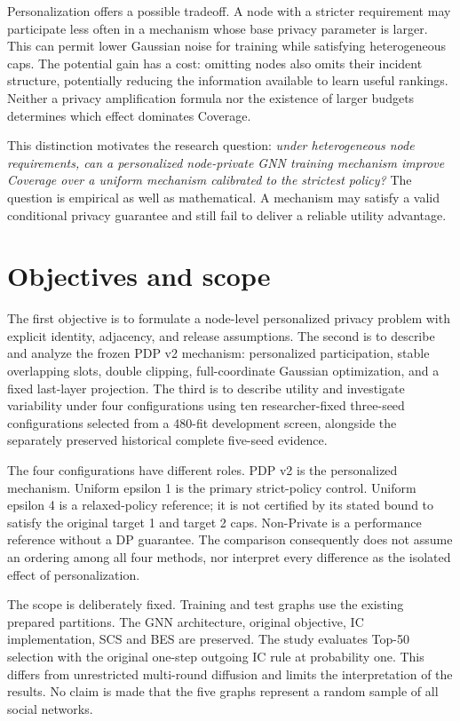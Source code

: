 Personalization offers a possible tradeoff. A node with a stricter requirement may participate less often in a mechanism whose base privacy parameter is larger. This can permit lower Gaussian noise for training while satisfying heterogeneous caps. The potential gain has a cost: omitting nodes also omits their incident structure, potentially reducing the information available to learn useful rankings. Neither a privacy amplification formula nor the existence of larger budgets determines which effect dominates Coverage.

This distinction motivates the research question: \emph{under heterogeneous node requirements, can a personalized node-private GNN training mechanism improve Coverage over a uniform mechanism calibrated to the strictest policy?} The question is empirical as well as mathematical. A mechanism may satisfy a valid conditional privacy guarantee and still fail to deliver a reliable utility advantage.

\section{Objectives and scope}
The first objective is to formulate a node-level personalized privacy problem with explicit identity, adjacency, and release assumptions. The second is to describe and analyze the frozen PDP v2 mechanism: personalized participation, stable overlapping slots, double clipping, full-coordinate Gaussian optimization, and a fixed last-layer projection. The third is to describe utility and investigate variability under four configurations using ten researcher-fixed three-seed configurations selected from a 480-fit development screen, alongside the separately preserved historical complete five-seed evidence.

The four configurations have different roles. PDP v2 is the personalized mechanism. Uniform epsilon 1 is the primary strict-policy control. Uniform epsilon 4 is a relaxed-policy reference; it is not certified by its stated bound to satisfy the original target 1 and target 2 caps. Non-Private is a performance reference without a DP guarantee. The comparison consequently does not assume an ordering among all four methods, nor interpret every difference as the isolated effect of personalization.

The scope is deliberately fixed. Training and test graphs use the existing prepared partitions. The GNN architecture, original objective, IC implementation, SCS and BES are preserved. The study evaluates Top-50 selection with the original one-step outgoing IC rule at probability one. This differs from unrestricted multi-round diffusion and limits the interpretation of the results. No claim is made that the five graphs represent a random sample of all social networks.

